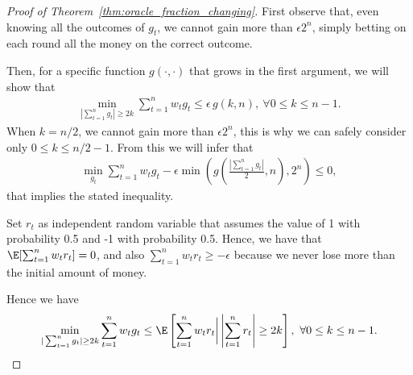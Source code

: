 \begin{proof}[Proof of Theorem~\ref{thm:oracle_fraction_changing}]
First observe that, even knowing all the outcomes of $g_t$, we cannot gain more than $\epsilon 2^n$, simply betting on each round all the money on the correct outcome.

Then, for a specific function $g(\cdot,\cdot)$ that grows in the first argument, we will show that
\begin{align*}
\min_{|\sum_{t=1}^n g_t| \geq 2 k} \sum_{t=1}^n w_t g_t 
\leq \epsilon \, g(k,n), \ \forall 0 \leq k \leq n-1.
\end{align*}
When $k=n/2$, we cannot gain more than $\epsilon 2^n$, this is why we can safely consider only $0\leq k\leq n/2-1$.
From this we will infer that
\begin{align*}
\min_{g_t} \sum_{t=1}^n w_t g_t - \epsilon\min\left(g\left(\frac{|\sum_{t=1}^n g_t|}{2},n\right),2^n\right) \leq 0,
\end{align*}
that implies the stated inequality.

Set $r_t$ as independent random variable that assumes the value of 1 with probability 0.5 and -1 with probability 0.5.
Hence, we have that $\E[ \sum_{t=1}^n w_t r_t ]=0$, and also $\sum_{t=1}^n w_t r_t \geq -\epsilon$ because we never lose more than the initial amount of money.

Hence we have
\begin{align*}
\min_{|\sum_{t=1}^n g_t| \geq 2 k} \sum_{t=1}^n w_t g_t 
\leq \E\left[\sum_{t=1}^n w_t r_t \bigg| \left|\sum_{t=1}^n r_t\right| \geq 2 k\right], \ \forall 0 \leq k \leq n-1.
\end{align*}


\end{proof}
